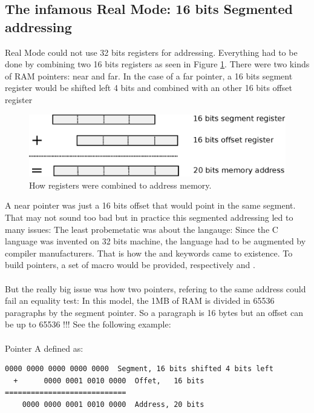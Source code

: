 \documentclass[book.tex]{subfiles}
\begin{document}
\subsection{The infamous Real Mode: 16 bits Segmented addressing}
Real Mode could not use 32 bits registers for addressing. Everything had to be done by combining two 16 bits registers as seen in Figure \ref{fig:register_comb_to_20_bits}. There were two kinds of RAM pointers: near and far. In the case of a far pointer, a 16 bits segment register would be shifted left 4 bits and combined with an other 16 bits offset register\\
\begin{figure}[H]
\centering
\includegraphics[scale=0.8]{imgs/register_combination_20_bits_address.eps}
\caption{How registers were combined to address memory.}
\label{fig:register_comb_to_20_bits}
\end{figure}
A near pointer was just a 16 bits offset that would point in the same segment.\\  
\bigskip
That may not sound too bad but in practice this segmented addressing led to many issues:
\bigskip
The least probemetatic was about the langauge: Since the C language was invented on 32 bits machine, the language had to be augmented by compiler manufacturers. That is how the  and  keywords came to existence. To build pointers, a set of macro would be provided, respectively  and .\\
\\
But the really big issue was how two pointers, refering to the same address could fail an equality test: In this model, the 1MB of RAM is divided in 65536 paragraphs by the segment pointer. So a paragraph is 16 bytes but an offset can be up to 65536 !!! See the following example:\\
\bigskip
\\Pointer A defined as:
\begin{Verbatim}[fontsize=\relsize{-1}]
    0000 0000 0000 0000 0000  Segment, 16 bits shifted 4 bits left  
  +      0000 0001 0010 0000  Offet,   16 bits
============================
    0000 0000 0001 0010 0000  Address, 20 bits
\end{Verbatim}
\end{document}
